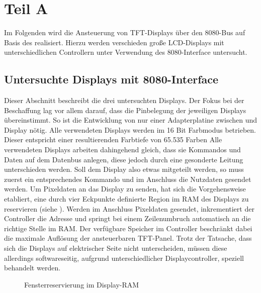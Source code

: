 \chapter{Teil A}
\label{cha:TeilA}
Im Folgenden wird die Ansteuerung von TFT-Displays über den 8080-Bus auf Basis des  realisiert. Hierzu werden verschieden große LCD-Displays mit unterschiedlichen Controllern unter Verwendung des 8080-Interface untersucht. 

\section{Untersuchte Displays mit 8080-Interface}
Dieser Abschnitt beschreibt die drei untersuchten Displays. Der Fokus bei der Beschaffung lag vor allem darauf, dass die Pinbelegung der jeweiligen Displays übereinstimmt. So ist die Entwicklung von nur einer Adapterplatine zwischen  und Display nötig. Alle verwendeten Displays werden im 16 Bit Farbmodus betrieben. Dieser entspricht einer resultierenden Farbtiefe von 65.535 Farben\newline %
Alle verwendeten Displays arbeiten dahingehend gleich, dass sie Kommandos und Daten auf dem Datenbus anlegen, diese jedoch durch eine gesonderte Leitung unterschieden werden. Soll dem Display also etwas mitgeteilt werden, so muss zuerst ein entsprechendes Kommando und im Anschluss die Nutzdaten gesendet werden. Um Pixeldaten an das Display zu senden, hat sich die Vorgehensweise etabliert, eine durch vier Eckpunkte definierte Region im RAM des Displays zu reservieren (siehe ). Werden im Anschluss Pixeldaten gesendet, inkrementiert der Controller die Adresse und springt bei einem Zeilenumbruch automatisch an die richtige Stelle im RAM. Der verfügbare Speicher im Controller beschränkt dabei die maximale Auflösung der ansteuerbaren TFT-Panel. Trotz der Tatsache, dass sich die Displays auf elektrischer Seite nicht unterscheiden, müssen diese allerdings softwareseitig, aufgrund unterschiedlicher Displaycontroller, speziell behandelt werden.
\begin{figure}[h]
	\centering
{}
	\caption{Fensterreservierung im Display-RAM}
	\label{fig:ram_window}
\end{figure}
